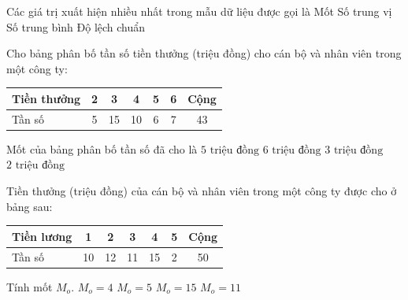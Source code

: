 \begin{ex}
	Các giá trị xuất hiện nhiều nhất trong mẫu dữ liệu được gọi là
	\choice
	{\True Mốt}
	{Số trung vị}
	{Số trung bình}
	{Độ lệch chuẩn}
\end{ex}

\begin{ex}
	Cho bảng phân bố tần số tiền thưởng (triệu đồng) cho cán bộ và nhân viên trong một công ty:
	\begin{center}
	\begin{tabular}{|l|c|c|c|c|c|c|}
		\hline
		Tiền thưởng & 2 & 3 & 4 & 5 & 6 & Cộng \\
		\hline
		Tần số & 5 & 15 & 10 & 6 & 7 & 43 \\
		\hline
	\end{tabular}
	\end{center}
	Mốt của bảng phân bố tần số đã cho là
	\choice
	{$5\text{ triệu đồng}$}
	{$6\text{ triệu đồng}$}
	{\True $3\text{ triệu đồng}$}
	{$2\text{ triệu đồng}$}
\end{ex}

\begin{ex}
	Tiền thưởng (triệu đồng) của cán bộ và nhân viên trong một công ty được cho ở bảng sau:
	\begin{center}
	\begin{tabular}{|l|c|c|c|c|c|c|}
		\hline
		Tiền lương & 1 & 2 & 3 & 4 & 5 & Cộng \\
		\hline
		Tần số & 10 & 12 & 11 & 15 & 2 & 50 \\
		\hline
	\end{tabular}
	\end{center}
	Tính mốt $M_o$.
	\choice
	{\True $M_o = 4$}
	{$M_o = 5$}
	{$M_o = 15$}
	{$M_o = 11$}
\end{ex}

